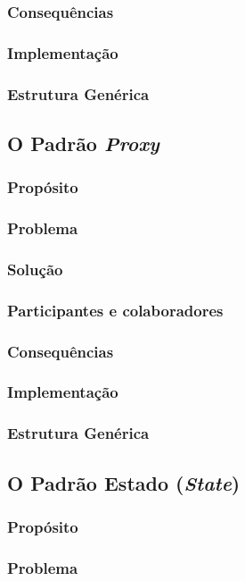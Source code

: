 \documentclass[
	11pt,				%
	openright,
	twoside,			%
	a4paper,			%
	english,			%
	french,
	brazil,				%
	sumario=tradicional
	]{abntex2}
\begin{document}
\subsubsection{Consequências}
\subsubsection{Implementação}
\subsubsection{Estrutura Genérica}

\subsection{O Padrão \textit{Proxy}}
\subsubsection{Propósito}
\subsubsection{Problema}
\subsubsection{Solução}
\subsubsection{Participantes e colaboradores}
\subsubsection{Consequências}
\subsubsection{Implementação}
\subsubsection{Estrutura Genérica}

\subsection{O Padrão Estado (\textit{State})}
\subsubsection{Propósito}
\subsubsection{Problema}
\end{document}
